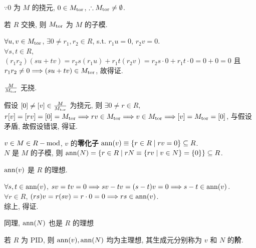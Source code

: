 \documentclass{note}
\begin{document}
$\because 0$ 为 $M$ 的挠元, $0\in M_{\operatorname{tor}}$, $\therefore M_{\operatorname{tor}}\neq\emptyset$.

若 $R$ 交换, 则 $M_{\operatorname{tor}}$ 为 $M$ 的子模.
\begin{pf}
    $\forall u,v\in M_{\operatorname{tor}}$, $\exists 0\neq r_1,r_2\in R$, s.t. $r_1u=0$, $r_2v=0$.\\
    $\forall s,t\in R$, $(r_1r_2)(su+tv)=r_2s(r_1u)+r_1t(r_2v)=r_2s\cdot 0+r_1t\cdot 0=0+0=0$ 且 $r_1r_2\neq 0\Longrightarrow(su+tv)\in M_{\operatorname{tor}}$, 故得证.
\end{pf}
  
$\frac{M}{M_{\operatorname{tor}}}$ 无挠.
\begin{pf}
    假设 $[0]\neq[v]\in\frac{M}{M_{\operatorname{tor}}}$ 为挠元, 则 $\exists 0\neq r\in R$, $r[v]=[rv]=[0]=M_{\operatorname{tor}}\Longrightarrow rv\in M_{\operatorname{tor}}\Longrightarrow v\in M_{\operatorname{tor}}\Longrightarrow[v]=M_{\operatorname{tor}}=[0]$, 与假设矛盾, 故假设错误, 得证.
\end{pf}

\begin{df}[零化子]
    $v\in M\in R-\operatorname{mod}$, $v$ 的\textbf{零化子} $\operatorname{ann}(v)\equiv\{r\in R\mid rv=0\}\subseteq R$.\\
    $N$ 是 $M$ 的子模, 则 $\operatorname{ann}(N)=\{r\in R\mid rN\equiv\{rv\mid v\in N\}=\{0\}\}\subseteq R$.
\end{df}

$\operatorname{ann}(v)$ 是 $R$ 的理想.
\begin{pf}
    $\forall s,t\in\operatorname{ann}(v)$, $sv=tv=0\Longrightarrow sv-tv=(s-t)v=0\Longrightarrow s-t\in\operatorname{ann}(v)$.\\
    $\forall r\in R$, $(rs)v=r(sv)=r\cdot 0=0\Longrightarrow rs\in\operatorname{ann}(v)$.\\
    综上, 得证.
\end{pf}
同理, $\operatorname{ann}(N)$ 也是 $R$ 的理想

\begin{df}[阶]
    若 $R$ 为 PID, 则 $\operatorname{ann}(v),\operatorname{ann}(N)$ 均为主理想, 其生成元分别称为 $v$ 和 $N$ 的\textbf{阶}.
\end{df}
\end{document}
